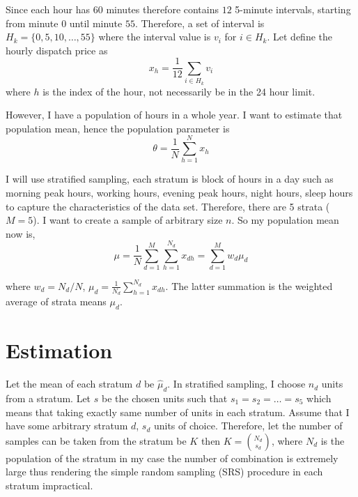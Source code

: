 \documentclass[11pt, a4paper]{article}
\begin{document}
Since each hour has $60$ minutes therefore contains $12$ 5-minute intervals, starting from minute $0$ until minute $55$. Therefore, a 
set of interval is $H_k=\{0,5,10,\ldots,55\}$ where the interval value is $v_i$ for $i\in H_k$. Let define the hourly dispatch price as
\begin{equation}
    x_h=\frac{1}{12}\sum_{i\in H_k}v_i
\end{equation}
where $h$ is the index of the hour, not necessarily be in the 24 hour limit.

However, I have a population of hours in a whole year. I want to estimate that population mean, hence the population parameter is 
\begin{equation}
    \theta = \frac1N\sum_{h=1}^{N}x_h
\end{equation}

I will use stratified sampling, each stratum is block of hours in a day such as morning peak hours, working hours, evening 
peak hours, night hours, sleep hours to capture the characteristics of the data set. Therefore, there are 5 strata ($M=5$). I want to create a sample 
of arbitrary size $n$. So my population mean now is,
\begin{equation}
    \mu=\frac1N\sum_{d=1}^{M}\sum_{h=1}^{N_d}x_{dh}=\sum_{d=1}^{M}w_d\mu_d
\end{equation}

where $w_d=N_d/N$, $\mu_d=\frac{1}{N_d}\sum_{h=1}^{N_d}x_{dh}$. The latter summation is the weighted average of strata means $\mu_d$.

\section*{Estimation}
Let the mean of each stratum $d$ be $\hat{\mu}_d$. In stratified sampling, I choose $n_d$ units from a stratum. Let $s$ be the chosen units such that $s_1=s_2=\ldots=s_5$ which means that taking exactly same number of 
units in each stratum. Assume that I have some arbitrary stratum $d$, $s_d$ units of choice. Therefore, let the number of samples can be taken from the stratum be $K$ then $K=\binom{N_d}{s_d}$, where $N_d$ is the 
population of the stratum in my case the number of combination is extremely large thus rendering the simple random sampling (SRS) procedure in each stratum impractical. 
\end{document}
